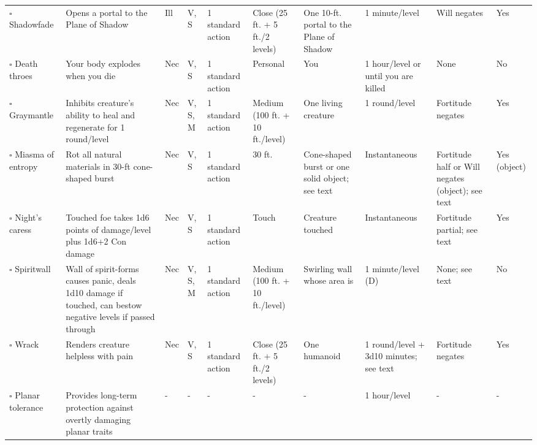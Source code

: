 \documentclass[12pt, a4paper]{article}
\begin{document}
\begin{center}
\begin{longtable}[H]{ p{8em} p{15em} p{2em} p{5em} p{6em} p{6em} p{10em} p{6em} p{5em} p{2em} }
    \(\square\) Shadowfade & Opens a portal to the Plane of Shadow & Ill & V, S & 1 standard action & Close (25 ft. + 5 ft./2 levels) & One 10-ft. portal to the Plane of Shadow & 1 minute/level & Will negates & Yes\\
    \(\square\) Death throes & Your body explodes when you die & Nec & V, S & 1 standard action & Personal & You & 1 hour/level or until you are killed & None & No\\
    \(\square\) Graymantle & Inhibits creature’s ability to heal and regenerate for 1 round/level & Nec & V, S, M & 1 standard action & Medium (100 ft. + 10 ft./level) & One living creature & 1 round/level & Fortitude negates & Yes\\
    \(\square\) Miasma of entropy & Rot all natural materials in 30-ft cone-shaped burst & Nec & V, S & 1 standard action & 30 ft. & Cone-shaped burst or one solid object; see text & Instantaneous & Fortitude half or Will negates (object); see text & Yes (object)\\
    \(\square\) Night’s caress & Touched foe takes 1d6 points of damage/level plus 1d6+2 Con damage & Nec & V, S & 1 standard action & Touch & Creature touched & Instantaneous & Fortitude partial; see text & Yes\\
    \(\square\) Spiritwall & Wall of spirit-forms causes panic, deals 1d10 damage if touched, can bestow negative levels if passed through & Nec & V, S, M & 1 standard action & Medium (100 ft. + 10 ft./level) & Swirling wall whose area is  & 1 minute/level (D) & None; see text & No\\
    \(\square\) Wrack & Renders creature helpless with pain & Nec & V, S & 1 standard action & Close (25 ft. + 5 ft./2 levels) & One humanoid & 1 round/level + 3d10 minutes; see text & Fortitude negates & Yes\\
    \(\square\) Planar tolerance & Provides long-term protection against overtly damaging planar traits & - & - & - & - & - & 1 hour/level & - & -\\
  \end{longtable}


\end{center}
\end{document}
